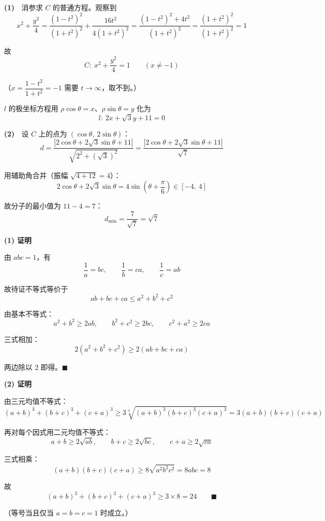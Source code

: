 \par\medskip



\textbf{(1)}　消参求 $C$ 的普通方程。观察到
\[x^{2}+\frac{y^{2}}4=\frac{\left(1-t^{2}\right)^{2}}{\left(1+t^{2}\right)^{2}}+\frac{16t^{2}}{4\left(1+t^{2}\right)^{2}}=\frac{\left(1-t^{2}\right)^{2}+4t^{2}}{\left(1+t^{2}\right)^{2}}=\frac{\left(1+t^{2}\right)^{2}}{\left(1+t^{2}\right)^{2}}=1\]

故
\[C:\ x^{2}+\frac{y^{2}}4=1\qquad(x\ne-1)\]

（$x=\dfrac{1-t^{2}}{1+t^{2}}=-1$ 需要 $t\to\infty$，取不到。）

$l$ 的极坐标方程用 $\rho\cos\theta=x$、$\rho\sin\theta=y$ 化为
\[l:\ 2x+\sqrt3y+11=0\]

\textbf{(2)}　设 $C$ 上的点为 $(\cos\theta,\ 2\sin\theta)$：
\[d=\frac{\left|2\cos\theta+2\sqrt3\sin\theta+11\right|}{\sqrt{2^{2}+\left(\sqrt3\right)^{2}}}=\frac{\left|2\cos\theta+2\sqrt3\sin\theta+11\right|}{\sqrt7}\]

用辅助角合并（振幅 $\sqrt{4+12}=4$）：
\[2\cos\theta+2\sqrt3\sin\theta=4\sin\left(\theta+\frac\pi6\right)\in[-4,\ 4]\]

故分子的最小值为 $11-4=7$：
\[d_{\min}=\frac7{\sqrt7}=\sqrt7\]

\par\medskip


\textbf{(1) 证明}

由 $abc=1$，有
\[\frac1a=bc,\qquad \frac1b=ca,\qquad \frac1c=ab\]

故待证不等式等价于
\[ab+bc+ca\le a^{2}+b^{2}+c^{2}\]

由基本不等式：
\[a^{2}+b^{2}\ge2ab,\qquad b^{2}+c^{2}\ge2bc,\qquad c^{2}+a^{2}\ge2ca\]

三式相加：
\[2\left(a^{2}+b^{2}+c^{2}\right)\ge2(ab+bc+ca)\]

两边除以 $2$ 即得。$\blacksquare$

\textbf{(2) 证明}

由三元均值不等式：
\[(a+b)^{3}+(b+c)^{3}+(c+a)^{3}\ge3\sqrt[3]{(a+b)^{3}(b+c)^{3}(c+a)^{3}}=3(a+b)(b+c)(c+a)\]

再对每个因式用二元均值不等式：
\[a+b\ge2\sqrt{ab},\qquad b+c\ge2\sqrt{bc},\qquad c+a\ge2\sqrt{ca}\]

三式相乘：
\[(a+b)(b+c)(c+a)\ge8\sqrt{a^{2}b^{2}c^{2}}=8abc=8\]

故
\[(a+b)^{3}+(b+c)^{3}+(c+a)^{3}\ge3\times8=24\qquad\blacksquare\]

（等号当且仅当 $a=b=c=1$ 时成立。）

